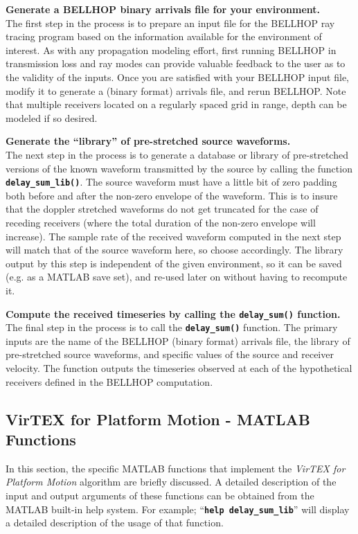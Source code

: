 \documentclass[12pt, letterpaper, oneside]{article}
\begin{document}
\begin{description}
\item {\bf Generate a BELLHOP binary arrivals file for your environment.}\hfill \\
The first step in the process is to prepare an input file for the BELLHOP
ray tracing program based on the information available for the environment
of interest. As with any propagation modeling effort, first running BELLHOP
in transmission loss and ray modes can provide valuable feedback to the
user as to the validity of the inputs. Once you are satisfied with your
BELLHOP input file, modify it to generate a (binary format) arrivals
file, and rerun BELLHOP. Note that multiple receivers located on a
regularly spaced grid in range, depth can be modeled if so desired.

\item {\bf Generate the ``library'' of pre-stretched source waveforms.}\hfill \\
The next step in the process is to generate a database or library of
pre-stretched versions of the known waveform transmitted by the source
by calling the function {\tt \bf delay\_sum\_lib()}.  The source waveform
must have a little bit of zero padding both before and after the
non-zero envelope of the waveform.  This is to insure that the
doppler stretched waveforms do not get truncated for the case of
receding receivers (where the total duration of the non-zero envelope
will increase). The sample rate of the received waveform computed in
the next step will match that of the source waveform here, so choose
accordingly. The library output by this step is independent of the given
environment, so it can be saved (e.g. as a MATLAB save set), and re-used
later on without having to recompute it.

\item {\bf Compute the received timeseries by calling the {\tt delay\_sum()} function.}\hfill \\
The final step in the process is to call the {\tt \bf delay\_sum()}
function. The primary inputs are the name of the BELLHOP (binary format)
arrivals file, the library of pre-stretched source waveforms, and specific
values of the source and receiver velocity. The function outputs the
timeseries observed at each of the hypothetical receivers defined in
the BELLHOP computation.

\end{description}

\subsection{VirTEX for Platform Motion - MATLAB Functions}
In this section, the specific MATLAB functions that implement the
{\em VirTEX for Platform Motion} algorithm are briefly discussed. A
detailed description of the input and output arguments of these
functions can be obtained from the MATLAB built-in help system.
For example; ``{\tt \bf help delay\_sum\_lib}'' will display
a detailed description of the usage of that function.
\end{document}

